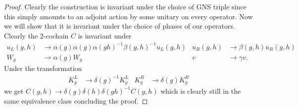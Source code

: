 \documentclass[12pt,a4paper,twoside]{article}
\theoremstyle{definition}
\numberwithin{equation}{section}
\begin{document}
\begin{proof}
	Clearly the construction is invariant under the choice of GNS triple since this simply amounts to an adjoint action by some unitary on every operator. Now we will show that it is invariant under the choice of phases of our operators. Clearly the 2-cochain $C$ is invariant under
	\begin{align}
		u_L(g,h)&\rightarrow \alpha(g)\alpha(g)\alpha(gh)^{-1}\beta(g,h)^{-1} u_L(g,h)&u_R(g,h)&\rightarrow \beta(g,h)u_R(g,h)\\
		W_g&\rightarrow\alpha(g)W_g&v&\rightarrow \gamma v.
	\end{align}
	Under the transformation
	\begin{align}
		K_g^L&\rightarrow \delta(g)^{-1}K_g^L&K_g^R&\rightarrow \delta(g)K_g^R
	\end{align}
	we get $C(g,h)\rightarrow \delta(g)\delta(h)\delta(gh)^{-1}C(g,h)$ which is clearly still in the same equivalence class concluding the proof.
\end{proof}
\end{document}
